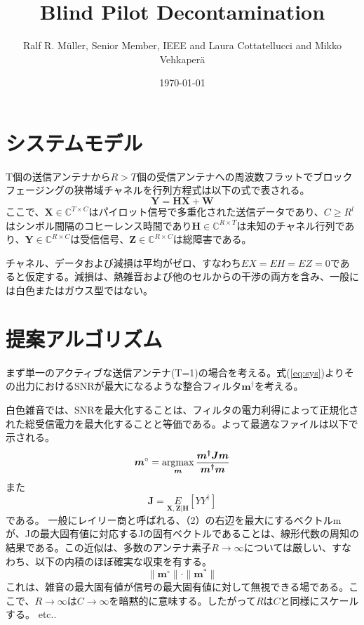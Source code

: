 \documentclass[11pt]{jsarticle}
\title{Blind Pilot Decontamination}
\author{Ralf R. M\"{u}ller, Senior Member, IEEE and Laura Cottatellucci and Mikko Vehkaper\"{a}}
\date{\today}
\newcommand{\argmax}{\mathop{\rm argmax}\limits}
\begin{document}
\maketitle
\section{システムモデル}
T個の送信アンテナから$R>T$個の受信アンテナへの周波数フラットでブロックフェージングの狭帯域チャネルを行列方程式は以下の式で表される。
\begin{equation}
  \label{eq:sys}
  \boldsymbol{Y}=\boldsymbol{HX+W}
\end{equation}
ここで、$\boldsymbol{X}\in\mathbb{C}^{T \times C}$はパイロット信号で多重化された送信データであり、$C\geq R^{l}$はシンボル間隔のコヒーレンス時間であり$\boldsymbol{H}\in\mathbb{C}^{R \times T}$は未知のチャネル行列であり、$\boldsymbol{Y}\in\mathbb{C}^{R \times C}$は受信信号、$\boldsymbol{Z}\in\mathbb{C}^{R \times C}$は総障害である。

チャネル、データおよび減損は平均がゼロ、すなわち$EX=EH=EZ=0$であると仮定する。減損は、熱雑音および他のセルからの干渉の両方を含み、一般には白色またはガウス型ではない。
\section{提案アルゴリズム}
まず単一のアクティブな送信アンテナ(T=1)の場合を考える。式(\ref{eq:sys})よりその出力におけるSNRが最大になるような整合フィルタ$\boldsymbol{m}^{\dagger}$を考える。

白色雑音では、SNRを最大化することは、フィルタの電力利得によって正規化された総受信電力を最大化することと等価である。よって最適なファイルは以下で示される。
\begin{equation}
  \boldsymbol{m}^{\circ}=\argmax_{\boldsymbol{m}}
    \frac{
      \boldsymbol{m^{\dagger}Jm}
      }
      {
        \boldsymbol{m^{\dagger}m}
      }
\end{equation}
また
\begin{equation}
  \boldsymbol{J}=\underset{\boldsymbol{X,Z|H}}E[YY^{\dagger}]
\end{equation}
である。
一般にレイリー商と呼ばれる、（2）の右辺を最大にするベクトルmが、Jの最大固有値に対応するJの固有ベクトルであることは、線形代数の周知の結果である。この近似は、多数のアンテナ素子$R\to \infty$については厳しい、すなわち、以下の内積のほぼ確実な収束を有する。
\begin{equation}
  \|\boldsymbol{m}^{\circ}\|\cdot \|\boldsymbol{m}^{*}\|
\end{equation}
これは、雑音の最大固有値が信号の最大固有値に対して無視できる場である。ここで、$R\to \infty$は$C\to \infty$を暗黙的に意味する。したがって$R$は$C$と同様にスケールする。
etc..
\end{document}
